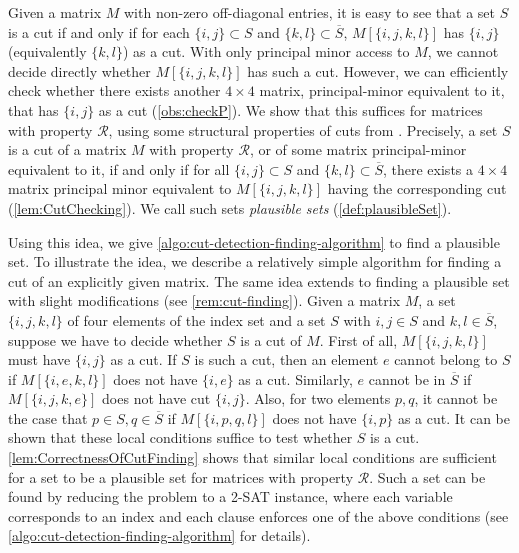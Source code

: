 \documentclass[11pt,letterpaper]{article}
\newcommand{\comp}[1]{\overline{#1}}
\newcommand{\rc}[1]{\textcolor{blue}{\guillemotleft \textbf{Roshan:} #1\guillemotright}}
\newcommand{\prop}{\mathcal{R}}
\begin{document}
{{Given a matrix $M$ with non-zero off-diagonal entries, it is easy to see that a set $S$ is a cut if and only if for each $\{i,j\}\subset S$ and $\{k,l\}\subset \comp{S}$, $M[\{i,j,k,l\}]$ has $\{i,j\}$ (equivalently $\{k,l\}$) as a cut. With only principal minor access to $M$, we cannot decide directly whether $M[\{i,j,k,l\}]$ has such a cut. However, we can efficiently check whether there exists another $4\times4$ matrix, principal-minor equivalent to it, that has $\{i,j\}$ as a cut (\cref{obs:checkP}). We show that this suffices for matrices with property $\prop$, using some structural properties of cuts from \cite{Chatterjee25}. Precisely, a set $S$ is a cut of a matrix $M$ with property $\prop$, or of some matrix principal-minor equivalent to it, if and only if for all $\{i,j\}\subset S$ and $\{k,l\}\subset \comp{S}$, there exists a $4\times4$ matrix principal minor equivalent to $M[\{i,j,k,l\}]$ having the corresponding cut (\cref{lem:CutChecking}). We call such sets \emph{plausible sets} (\cref{def:plausibleSet}).

Using this idea, we give \cref{algo:cut-detection-finding-algorithm} to find a plausible set. To illustrate the idea, we describe a relatively simple algorithm for finding a cut of an explicitly given matrix. The same idea extends to finding a plausible set with slight modifications (see \cref{rem:cut-finding}). Given a matrix $M$, a set $\{i,j,k,l\}$ of four elements of the index set and a set $S$ with $i,j\in S$ and $k,l\in \comp{S}$, suppose we have to decide whether $S$ is a cut of $M$. First of all, $M[\{i,j,k,l\}]$ must have $\{i,j\}$ as a cut. If $S$ is such a cut, then an element $e$ cannot belong to $S$ if $M[\{i,e,k,l\}]$ does not have $\{i,e\}$ as a cut. Similarly, $e$ cannot be in $\comp{S}$ if $M[\{i,j,k,e\}]$ does not have cut $\{i,j\}$.  Also, for two elements $p,q$, it cannot be the case that $p\in S, q\in \comp{S}$ if $M[\{i,p,q,l\}]$ does not have $\{i,p\}$ as a cut. It can be shown that these local conditions suffice to test whether $S$ is a cut. \cref{lem:CorrectnessOfCutFinding} shows that similar local conditions are sufficient for a set to be a plausible set for matrices with property $\prop$. Such a set can be found by reducing the problem to a 2-SAT instance, where each variable corresponds to an index and each clause enforces one of the above conditions (see \cref{algo:cut-detection-finding-algorithm} for details). \\



}}
\end{document}
